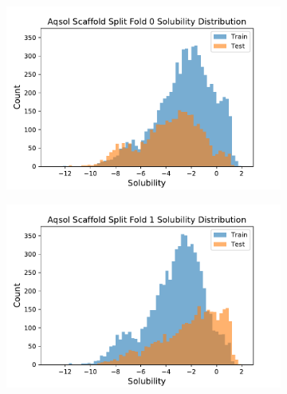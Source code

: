 \documentclass[journal=jcisd8,manuscript=article]{achemso}
\begin{document}
\begin{figure}[tb]
    \centering
    \begin{subfigure}[t]{0.48\textwidth}
        \centering
        \includegraphics[width=\linewidth]{figures/aqsol_scaf0_soldist.pdf}
    \end{subfigure}%
    \hfill
    \begin{subfigure}[t]{0.48\textwidth}
        \centering
        \includegraphics[width=\linewidth]{figures/aqsol_scaf1_soldist.pdf}
    \end{subfigure}
    

\end{figure}
\end{document}

